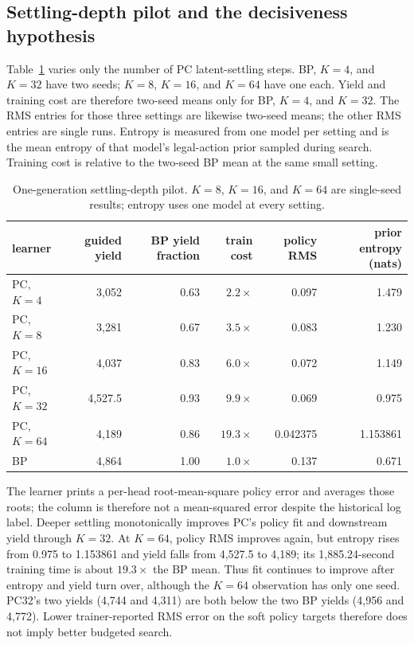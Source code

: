 \documentclass[11pt]{article}
\begin{document}
\subsection{Settling-depth pilot and the decisiveness hypothesis}
\label{sec:decisiveness}

Table~\ref{tab:settling} varies only the number of PC latent-settling steps.  BP, $K=4$,
and $K=32$ have two seeds; $K=8$, $K=16$, and $K=64$ have one each.  Yield and training
cost are therefore two-seed means only for BP, $K=4$, and $K=32$.  The RMS entries for
those three settings are likewise two-seed means; the other RMS entries are single runs.
Entropy is measured from one model per setting and is the mean entropy of that model's
legal-action prior sampled during search.  Training cost is relative to the two-seed BP
mean at the same small setting.

\begin{table}[ht]
\centering
\caption{One-generation settling-depth pilot.  $K=8$, $K=16$, and $K=64$ are
single-seed results; entropy uses one model at every setting.}
\label{tab:settling}
\begin{tabular}{@{}lrrrrr@{}}
\toprule
learner & guided yield & BP yield fraction & train cost & policy RMS & prior entropy (nats) \\
\midrule
PC, $K=4$  & 3,052 & 0.63 & $2.2\times$ & 0.097 & 1.479 \\
PC, $K=8$  & 3,281 & 0.67 & $3.5\times$ & 0.083 & 1.230 \\
PC, $K=16$ & 4,037 & 0.83 & $6.0\times$ & 0.072 & 1.149 \\
PC, $K=32$ & 4,527.5 & 0.93 & $9.9\times$ & 0.069 & 0.975 \\
PC, $K=64$ & 4,189 & 0.86 & $19.3\times$ & 0.042375 & 1.153861 \\
BP          & 4,864 & 1.00 & $1.0\times$ & 0.137 & 0.671 \\
\bottomrule
\end{tabular}
\end{table}

The learner prints a per-head root-mean-square policy error and averages those roots; the
column is therefore not a mean-squared error despite the historical log label.  Deeper
settling monotonically improves PC's policy fit and downstream yield through $K=32$.
At $K=64$, policy RMS improves again, but entropy rises from 0.975 to 1.153861 and yield
falls from 4,527.5 to 4,189; its 1,885.24-second training time is about $19.3\times$ the BP
mean.  Thus fit continues to improve after entropy and yield turn over, although the
$K=64$ observation has only one seed.  PC32's two yields (4,744 and 4,311) are both below
the two BP yields (4,956 and 4,772).  Lower trainer-reported RMS error on the soft policy
targets therefore does not imply better budgeted search.
\end{document}
